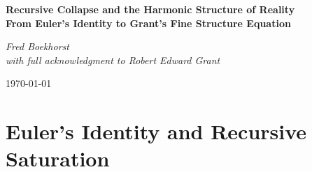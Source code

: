 \documentclass[12pt]{article}
\begin{document}
\begin{titlepage}
    \centering
    \vspace*{4cm}
    {\Huge\bfseries
    Recursive Collapse and the Harmonic Structure of Reality\\[0.5em]
    \Large From Euler’s Identity to Grant’s Fine Structure Equation\par}
    \vspace{2.5cm}
    {\Large\itshape
    Fred Boekhorst\\
    with full acknowledgment to Robert Edward Grant\par}
    \vfill
    {\large
    \today\par}
\end{titlepage}


\begin{abstract}
This paper explores a structural resonance between two mathematically and symbolically rich expressions: Euler’s Identity,
\[
e^{i\pi} + 1 = 0,
\]
and Robert Edward Grant’s harmonic formulation of the Fine Structure Constant,
\[
\left( \sqrt{3} - 1 - \frac{1}{432} \right) \cdot 10^{-2} \approx \alpha.
\]

Recasting these expressions through the lens of base-9 modular arithmetic without zero, we reinterpret Euler’s identity as a recursive closure:
\[
e^{i\pi} + 1 \equiv 9 \mod 9,
\]
where 9 replaces 0 as the symbolic digit of saturation and structural completion.

Applying digital root analysis, Grant’s expression reduces to 2, and the measured fine structure constant reduces to 7. Their sum,
\[
2 + 7 = 9,
\]
mirrors Euler’s closure point, suggesting a modular complementarity between symbolic approximation and empirical value.

This framework does not alter the numerical definitions of the constants, but highlights formal and symbolic relationships that emerge when recursive, harmonic, and modular perspectives are applied. The findings suggest that exponential rotation and harmonic descent may converge on shared numerical invariants — revealing structure beneath what traditionally appears distinct.
\end{abstract}



\newpage
\section{Euler’s Identity and Recursive Saturation}
\end{document}
